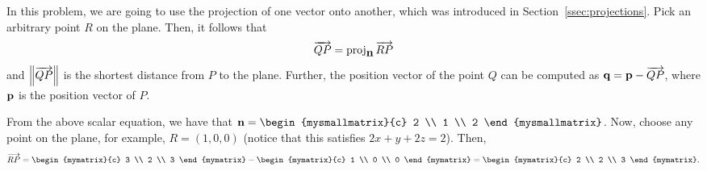 \begin{solution}
  In this problem, we are going to use the projection of one vector
  onto another, which was introduced in
  Section~\ref{ssec:projections}.  Pick an arbitrary point $R$ on
  the plane. Then, it follows that
  \[
    \overrightarrow{QP} = \mbox{\rm proj}_{\mbox{\bf n}}\,\overrightarrow{RP}
  \]
  and $\left\|\overrightarrow{QP}\right\|$ is the shortest distance from $P$ to the
  plane. Further, the position vector of the point $Q$ can be computed
  as $\mbox{\bf q} = \mbox{\bf p} - \overrightarrow{QP}$, where $\mbox{\bf p}$ is the
  position vector of $P$.
  \begin{center}
  \end{center}
  From the above scalar equation, we have that $\vect{n} =
  \begin{mysmallmatrix}{c} 2 \\ 1 \\ 2 \end{mysmallmatrix}$.  Now, choose any
  point on the plane, for example, $R = (1,0,0)$ (notice that this
  satisfies $2x+y+2z=2$).  Then,
  \begin{equation*}
    \longvect{RP} = \begin{mymatrix}{c} 3 \\ 2 \\ 3 \end{mymatrix}
    - \begin{mymatrix}{c} 1 \\ 0 \\ 0 \end{mymatrix} =
    \begin{mymatrix}{c} 2 \\ 2 \\ 3 \end{mymatrix}.

\end{equation*}
\end{solution}
